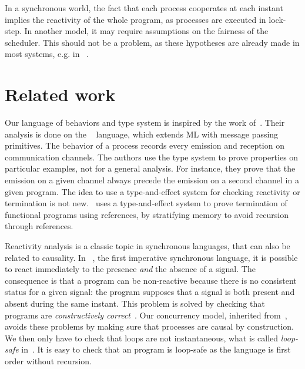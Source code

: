 \documentclass[9pt]{sigplanconf}
\begin{document}
In a synchronous world, the fact that each process cooperates at each instant implies the reactivity of the whole program, as processes are executed in lock-step. In another model, it may require assumptions on the fairness of the scheduler. This should not be a problem, as these hypotheses are already made in most systems, e.g. in \conhaskell~\cite{Jones:1996}.



\section{Related work}
\label{sec:related_work}


Our language of behaviors and type system is inspired by the work of~\cite{Amtoft:1999}. Their analysis is done on the \cml~\cite{Reppy:2007} language, which extends ML with message passing primitives. The behavior of a process records every emission and reception on communication channels. The authors use the type system to prove properties on particular examples, not for a general analysis. For instance, they prove that the emission on a given channel always precede the emission on a second channel in a given program. The idea to use a type-and-effect system for checking reactivity or termination is not new. \cite{Boudol:2010}~uses a type-and-effect system to prove termination of functional programs using references, by stratifying memory to avoid recursion through references.

Reactivity analysis is a classic topic in synchronous languages, that can also be related to causality. In \esterel~\cite{Berry:1997}, the first imperative synchronous language, it is possible to react immediately to the presence \emph{and} the absence of a signal. The consequence is that a program can be non-reactive because there is no consistent status for a given signal: the program supposes that a signal is both present and absent during the same instant. This problem is solved by checking that programs are \emph{constructively correct}~\cite{Berry:1996}. Our concurrency model, inherited from~\cite{Boussinot:1991}, avoids these problems by making sure that processes are causal by construction. We then only have to check that loops are not instantaneous, what is called \emph{loop-safe} in~\cite{Berry:1996}.  It is easy to check that an \esterel program is loop-safe as the language is first order without recursion. 
\end{document}
